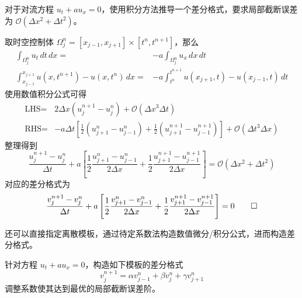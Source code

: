 \begin{example}
    对于对流方程 $u_t + a u_x = 0$，使用积分方法推导一个差分格式，要求局部截断误差为 $\mathcal{O}(\Delta x^2+\Delta t^2)$。
\end{example}

\begin{solution*}
    取时空控制体 $\Omega_j^n = [x_{j-1},x_{j+1}] \times [t^n,t^{n+1}]$，那么
    \begin{align*}
        \int_{\Omega_j^n} u_t\,dt\,dx ={}                        & - a \int_{\Omega_j^n} u_x\,dx\,dt \\
        \int_{x_{j-1}}^{x_{j+1}} u(x,t^{n+1}) - u(x,t^n)\,dx ={} &
        - a \int_{t^n}^{t^{n+1}} u(x_{j+1},t) - u(x_{j-1},t) \,dt
    \end{align*}
    使用数值积分公式可得
    \begin{align*}
        \text{LHS} ={} & 2 \Delta x (u_j^{n+1} - u_j^n) +  \mathcal{O}(\Delta x^3 \Delta t) \\
        \text{RHS} ={} & - a \Delta t
        \left[
            \frac12 (u_{j+1}^n - u_{j-1}^n) + \frac12 (u_{j+1}^{n+1} - u_{j-1}^{n+1})
            \right] + \mathcal{O}(\Delta t^3 \Delta x)
    \end{align*}
    整理得到
    \[
        \frac{u_{j}^{n+1} - u_j^n}{\Delta t}
        + a \left[ \frac12 \frac{u_{j+1}^n - u_{j-1}^n}{2\Delta x} + \frac12 \frac{u_{j+1}^{n+1} - u_{j-1}^{n+1}}{2\Delta x} \right]
        = \mathcal{O}(\Delta x^2 + \Delta t^2)
    \]
    对应的差分格式为
    \[
        \frac{v_{j}^{n+1} - v_j^n}{\Delta t}
        + a \left[ \frac12 \frac{v_{j+1}^n - v_{j-1}^n}{2\Delta x} + \frac12 \frac{v_{j+1}^{n+1} - v_{j-1}^{n+1}}{2\Delta x} \right] = 0 \qedhere
    \]
\end{solution*}



还可以直接指定离散模板，通过待定系数法构造数值微分/积分公式，进而构造差分格式。

\begin{example}
    针对方程 $u_t + a u_x = 0$，构造如下模板的差分格式
    \[
        v_j^{n+1} = \alpha v_{j-1}^n + \beta v_j^n + \gamma v_{j+1}^n
    \]
    调整系数使其达到最优的局部截断误差阶。
\end{example}

